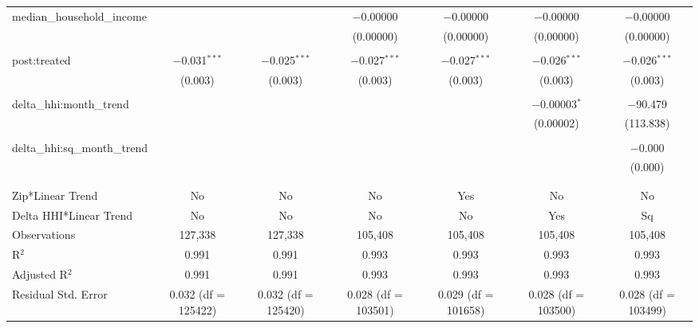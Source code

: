 \begin{table}[H]
{\begin{tabular}{@{\extracolsep{5pt}}lcccccc}
  median\_household\_income &  &  & $-$0.00000 & $-$0.00000 & $-$0.00000 & $-$0.00000 \\  

   &  &  & (0.00000) & (0.00000) & (0.00000) & (0.00000) \\  

   & & & & & & \\  

  post:treated & $-$0.031$^{***}$ & $-$0.025$^{***}$ & $-$0.027$^{***}$ & $-$0.027$^{***}$ & $-$0.026$^{***}$ & $-$0.026$^{***}$ \\  

   & (0.003) & (0.003) & (0.003) & (0.003) & (0.003) & (0.003) \\  

   & & & & & & \\  

  delta\_hhi:month\_trend &  &  &  &  & $-$0.00003$^{*}$ & $-$90.479 \\  

   &  &  &  &  & (0.00002) & (113.838) \\  

   & & & & & & \\  

  delta\_hhi:sq\_month\_trend &  &  &  &  &  & $-$0.000 \\  

   &  &  &  &  &  & (0.000) \\  

   & & & & & & \\  

 \hline \\[-1.8ex]  

 Zip*Linear Trend & No & No & No & Yes & No & No \\  

 Delta HHI*Linear Trend & No & No & No & No & Yes & Sq \\  

 Observations & 127,338 & 127,338 & 105,408 & 105,408 & 105,408 & 105,408 \\  

 R$^{2}$ & 0.991 & 0.991 & 0.993 & 0.993 & 0.993 & 0.993 \\  

 Adjusted R$^{2}$ & 0.991 & 0.991 & 0.993 & 0.993 & 0.993 & 0.993 \\  

 Residual Std. Error & 0.032 (df = 125422) & 0.032 (df = 125420) & 0.028 (df = 103501) & 0.029 (df = 101658) & 0.028 (df = 103500) & 0.028 (df = 103499) \\  


\end{tabular}}
\end{table}
